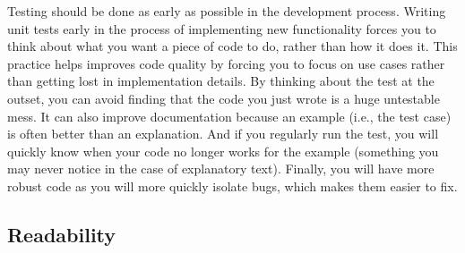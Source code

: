\documentclass[ChapterTOCs,krantz2]{krantz} %
\theoremstyle{definition}
\begin{document}
Testing should be done as early as possible in the development process.
Writing unit tests early in the process of implementing new functionality
forces you to think about what you want a piece of code to do, rather than how
it does it. This practice helps improves code quality by forcing you to focus
on use cases rather than getting lost in implementation details. By thinking
about the test at the outset, you can avoid finding that the code you just
wrote is a huge untestable mess. It can also improve documentation because an
example (i.e., the test case) is often better than an explanation. And if you
regularly run the test, you will quickly know when your code no longer works
for the example (something you may never notice in the case of explanatory
text). Finally, you will have more robust code as you will more quickly
isolate bugs, which makes them easier to fix.\cite{oram2010making}

%
%
%
%
%
%
%
%

\subsection{Readability}
\end{document}

